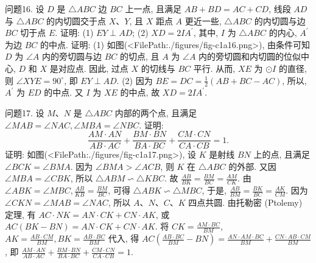 问题16. 设 $D$ 是 $\triangle A B C$ 边 $B C$ 上一点, 且满足 $A B+B D=A C+C D$, 线段 $A D$ 与 $\triangle A B C$ 的内切圆交于点 $X 、 Y$, 且 $X$ 距点 $A$ 更近一些, $\triangle A B C$ 的内切圆与边 $B C$ 切于点 $E$. 证明: (1) $E Y \perp A D$; (2) $X D=2 I A^{\prime}$, 其中, $I$ 为 $\triangle A B C$ 的内心, $A^{\prime}$ 为边 $B C$ 的中点.
证明: (1) 如图(<FilePath:./figures/fig-c1a16.png>), 由条件可知 $D$ 为 $\angle A$ 内的旁切圆与边 $B C$ 的切点, 且 $A$ 为 $\angle A$ 内的旁切圆和内切圆的位似中心, $D$ 和 $X$ 是对应点.
因此, 过点 $X$ 的切线与 $B C$ 平行.
从而, $X E$ 为 $\odot I$ 的直径, 则 $\angle X Y E=90^{\circ}$, 即 $E Y \perp A D$.
(2) 因为 $B E=D C=\frac{1}{2}(A B+B C-A C)$, 所以, $A^{\prime}$ 为 $E D$ 的中点.
又 $I$ 为 $X E$ 的中点, 故 $X D=2 I A^{\prime}$.



问题17. 设 $M 、 N$ 是 $\triangle A B C$ 内部的两个点, 且满足 $\angle M A B=\angle N A C, \angle M B A= \angle N B C$. 证明:
$$
\frac{A M \cdot A N}{A B \cdot A C}+\frac{B M \cdot B N}{B A \cdot B C}+\frac{C M \cdot C N}{C A \cdot C B}=1 .
$$
证明: 如图(<FilePath:./figures/fig-c1a17.png>), 设 $K$ 是射线 $B N$ 上的点, 且满足 $\angle B C K=\angle B M A$. 因为 $\angle B M A>\angle A C B$, 则 $K$ 在 $\triangle A B C$ 的外部.
又因 $\angle M B A=\angle C B K$, 所以 $\triangle A B M \backsim \triangle K B C$. 故 $\frac{A B}{B K}=\frac{B M}{B C}=\frac{A M}{C K}$. 由 $\angle A B K=\angle M B C, \frac{A B}{K B}=\frac{B M}{B C}$, 可得 $\triangle A B K \backsim \triangle M B C$, 于是, $\frac{A B}{B M}=\frac{B K}{B C}=\frac{A K}{C M}$. 因为 $\angle C K N=\angle M A B=\angle N A C$, 所以 $A 、 N 、 C 、 K$ 四点共圆.
由托勒密 (Ptolemy) 定理, 有 $A C \cdot N K=A N \cdot C K+C N \cdot A K$, 或 $A C(B K-B N)=A N \cdot C K+C N \cdot A K$. 将 $C K=\frac{A M \cdot B C}{B M}$, $A K=\frac{A B \cdot C M}{B M}, B K=\frac{A B \cdot B C}{B M}$ 代入, 得 $A C\left(\frac{A B \cdot B C}{B M}-B N\right)= \frac{A N \cdot A M \cdot B C}{B M}+\frac{C N \cdot A B \cdot C M}{B M}$, 即 $\frac{A M \cdot A N}{A B \cdot A C}+\frac{B M \cdot B N}{B A \cdot B C}+\frac{C M \cdot C N}{C A \cdot C B}=1$.



